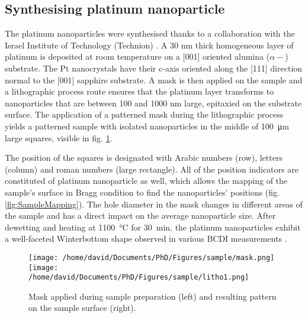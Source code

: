 \subsection{Synthesising platinum nanoparticle}\label{sec:PtParticles}

The platinum nanoparticles were synthesised thanks to a collaboration with the Israel Institute of Technology (Technion) \parencite{Dupraz2017}.
A 30 nm thick homogeneous layer of platinum is deposited at room temperature on a [001] oriented alumina ($\alpha-$) substrate.
The Pt nanocrystals have their c-axis oriented along the [111] direction normal to the [001] sapphire substrate.
A mask is then applied on the sample and a lithographic process route ensures that the platinum layer transforms to nanoparticles that are between 100 and 1000 nm large, epitaxied on the substrate surface.
The application of a patterned mask during the lithographic process yields a patterned sample with isolated nanoparticles in the middle of \qty{100}{\um} large squares, visible in fig. \ref{fig:Mask}.

The position of the squares is designated with Arabic numbers (row), letters (column) and roman numbers (large rectangle).
All of the position indicators are constituted of platinum nanoparticle as well, which allows the mapping of the sample's surface in Bragg condition to find the nanoparticles' positions (fig. \ref{fig:SampleMapping}).
The hole diameter in the mask changes in different areas of the sample and has a direct impact on the average nanoparticle size.
After dewetting and heating at \qty{1100}{\degreeCelsius} for \qty{30}{\minute}, the platinum nanoparticles exhibit a well-faceted Winterbottom shape observed in various BCDI measurements \parencite{Dupraz2017}.

\begin{figure}[!htb]
    \centering
    \texttt{[image: /home/david/Documents/PhD/Figures/sample/mask.png]}
    \texttt{[image: /home/david/Documents/PhD/Figures/sample/litho1.png]}
    \caption{
        Mask applied during sample preparation (left) and resulting pattern on the sample surface (right).
    }
    \label{fig:Mask}
\end{figure}

